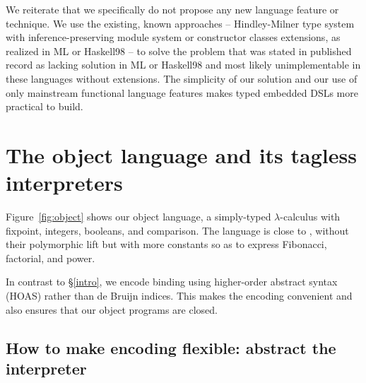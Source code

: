 We reiterate that we specifically do not propose any new language
feature or technique. We use the existing, known approaches --
Hindley-Milner type system with inference-preserving module system or
constructor classes extensions, as realized in ML or Haskell98 -- to
solve the problem that was stated in published record as lacking
solution in ML or Haskell98 and most likely unimplementable in these
languages without extensions. The simplicity of our solution and our
use of only mainstream functional language features makes typed
embedded DSLs more practical to build.
\begin{comment}
We may claim some contribution about type-preserving CPS. Check
related work section in \cite{Guillemette-Monier-PLPV}, especially
check the work of Shao on type-preserving CPS in Flint. The PLPV paper
in related work shows other tasks, including closure conversion, which
we may tackle in our approach. We may be able to write a
type-preserving, assured compiler, whose properties and assured by HM.
\end{comment}


\section{The object language and its tagless interpreters}\label{language}

Figure~\ref{fig:object} shows our object language, a simply-typed
$\lambda$-calculus with fixpoint, integers, booleans, and comparison.
The language is close to , without their polymorphic
lift but with more constants so as to express Fibonacci, factorial, and
power.

In contrast to \S\ref{intro}, we encode binding using higher-order
abstract syntax (HOAS) \cite{miller-manipulating,pfenning-higher-order}
rather than de Bruijn indices. This makes the encoding convenient and
also ensures that our object programs are closed.

\subsection{How to make encoding flexible: abstract the interpreter}
\label{encoding}

